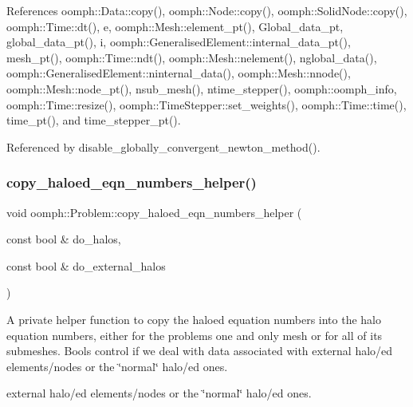 References oomph\+::\+Data\+::copy(), oomph\+::\+Node\+::copy(), oomph\+::\+Solid\+Node\+::copy(), oomph\+::\+Time\+::dt(), e, oomph\+::\+Mesh\+::element\+\_\+pt(), Global\+\_\+data\+\_\+pt, global\+\_\+data\+\_\+pt(), i, oomph\+::\+Generalised\+Element\+::internal\+\_\+data\+\_\+pt(), mesh\+\_\+pt(), oomph\+::\+Time\+::ndt(), oomph\+::\+Mesh\+::nelement(), nglobal\+\_\+data(), oomph\+::\+Generalised\+Element\+::ninternal\+\_\+data(), oomph\+::\+Mesh\+::nnode(), oomph\+::\+Mesh\+::node\+\_\+pt(), nsub\+\_\+mesh(), ntime\+\_\+stepper(), oomph\+::oomph\+\_\+info, oomph\+::\+Time\+::resize(), oomph\+::\+Time\+Stepper\+::set\+\_\+weights(), oomph\+::\+Time\+::time(), time\+\_\+pt(), and time\+\_\+stepper\+\_\+pt().



Referenced by disable\+\_\+globally\+\_\+convergent\+\_\+newton\+\_\+method().

\mbox{\label{classoomph_1_1Problem_a3d06660ec06b402f14d4b33a84621214}} 
\subsubsection{\texorpdfstring{copy\+\_\+haloed\+\_\+eqn\+\_\+numbers\+\_\+helper()}{copy\_haloed\_eqn\_numbers\_helper()}}
{\footnotesize\ttfamily void oomph\+::\+Problem\+::copy\+\_\+haloed\+\_\+eqn\+\_\+numbers\+\_\+helper (\begin{DoxyParamCaption}\item[{const bool \&}]{do\+\_\+halos,  }\item[{const bool \&}]{do\+\_\+external\+\_\+halos }\end{DoxyParamCaption})\hspace{0.3cm}{\ttfamily [private]}}



A private helper function to copy the haloed equation numbers into the halo equation numbers, either for the problem\textquotesingle{}s one and only mesh or for all of its submeshes. Bools control if we deal with data associated with external halo/ed elements/nodes or the \char`\"{}normal\char`\"{} halo/ed ones. 

external halo/ed elements/nodes or the \char`\"{}normal\char`\"{} halo/ed ones.

